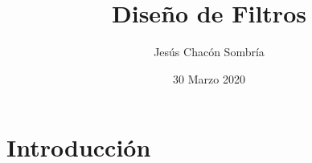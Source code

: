 \documentclass{beamer}
\title{Diseño de Filtros}
\institute{Universidad Complutense de Madrid}
\author{Jesús Chacón Sombría}
\date{30 Marzo 2020}
\begin{document}
\maketitle

\section{Introducción}


\end{document}

